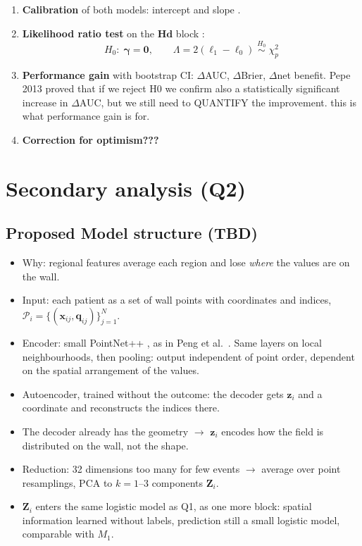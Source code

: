 \begin{enumerate}
    \item \textbf{Calibration} of both models: intercept and slope \cite{alba_discrimination_2017}. 
    \item \textbf{Likelihood ratio test} on the $\mathbf{Hd}$ block \cite{pepe_testing_2013}:
    \begin{equation}
        H_0:\; \boldsymbol{\gamma} = \mathbf{0},
        \qquad
        \Lambda = 2\left(\ell_1 - \ell_0\right) \;\overset{H_0}{\sim}\; \chi^2_{p}
    \end{equation}
    \item \textbf{Performance gain} with bootstrap CI: $\Delta$AUC, $\Delta$Brier, $\Delta$net benefit. Pepe 2013 proved that if we reject H0 we confirm also a statistically significant increase in $\Delta$AUC, but we still need to QUANTIFY the improvement. this is what performance gain is for. 
    
    \item \textbf{Correction for optimism???}
\end{enumerate}

\section{Secondary analysis (Q2)}

\subsection{Proposed Model structure (TBD)}
\begin{itemize}
    \item Why: regional features average each region and lose \emph{where} the values are on the wall.
    \item Input: each patient as a set of wall points with coordinates and indices, $\mathcal{P}_i = \{(\mathbf{x}_{ij}, \mathbf{q}_{ij})\}_{j=1}^{N}$.
    \item Encoder: small PointNet++ , as in Peng et al.\ . Same layers on local neighbourhoods, then pooling: output independent of point order, dependent on the spatial arrangement of the values.
    \item Autoencoder, trained without the outcome: the decoder gets $\mathbf{z}_i$ and a coordinate and reconstructs the indices there.
    \item The decoder already has the geometry $\rightarrow$ $\mathbf{z}_i$ encodes how the field is distributed on the wall, not the shape.
    \item Reduction: 32 dimensions too many for few events $\rightarrow$ average over point resamplings, PCA to $k = 1$--$3$ components $\mathbf{Z}_i$.
    \item $\mathbf{Z}_i$ enters the same logistic model as Q1, as one more block: spatial information learned without labels, prediction still a small logistic model, comparable with $M_1$.

\end{itemize}

